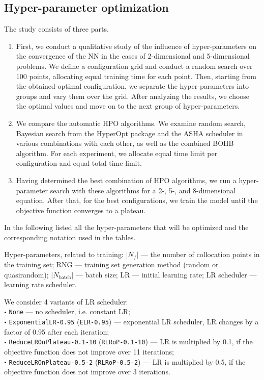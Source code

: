 \documentclass[reprint,
superscriptaddress,
amsmath,amssymb,aps,showkeys,showpacs,
twoside,final,secnumarabic,%
nofootinbib]{revtex4-2}
\newcommand\sbullet[1][.5]{\mathbin{\vcenter{\hbox{\scalebox{#1}{$\bullet$}}}}}
\begin{document}
\subsection{Hyper-parameter optimization}
The study consists of three parts.

\begin{enumerate}
\item First, we conduct a qualitative study of the influence of hyper-parameters on the convergence of the NN in the cases of 2-dimensional and 5-dimensional problems. We define a configuration grid and conduct a random search over 100 points, allocating equal training time for each point. Then, starting from the obtained optimal configuration, we separate the hyper-parameters into groups and vary them over the grid. After analyzing the results, we choose the optimal values and move on to the next group of hyper-parameters.

\item We compare the automatic HPO algorithms. We examine random search, Bayesian search from the HyperOpt package and the ASHA scheduler in various combinations with each other, as well as the combined BOHB algorithm. For each experiment, we allocate equal time limit per configuration and equal total time limit.

\item Having determined the best combination of HPO algorithms, we run a hyper-parameter search with these algorithms for a 2-, 5-, and 8-dimensional equation. After that, for the best configurations, we train the model until the objective function converges to a plateau.
\end{enumerate}

In the following listed all the hyper-parameters that will be optimized and the corresponding notation used in the tables.

Hyper-parameters, related to training: $|N_f|$ — the number of collocation points in the training set; RNG — training set generation method (random or quasirandom); $|N_\mathrm{batch}|$ — batch size; LR — initial learning rate; LR scheduler — learning rate scheduler.

We consider 4 variants of LR scheduler:\\
$\sbullet[0.5]$ \texttt{None} — no scheduler, i.e. constant LR;\\
$\sbullet[0.5]$ \texttt{ExponentialLR-0.95} (\texttt{ELR-0.95}) — exponential LR scheduler, LR changes by a factor of 0.95 after each iteration;\\
$\sbullet[0.5]$ \texttt{ReduceLROnPlateau-0.1-10} (\texttt{RLRoP-0.1-10}) — LR is multiplied by 0.1, if the objective function does not improve over 11 iterations;\\
$\sbullet[0.5]$ \texttt{ReduceLROnPlateau-0.5-2} (\texttt{RLRoP-0.5-2}) — LR is multiplied by 0.5, if the objective function does not improve over 3 iterations.
\end{document}
